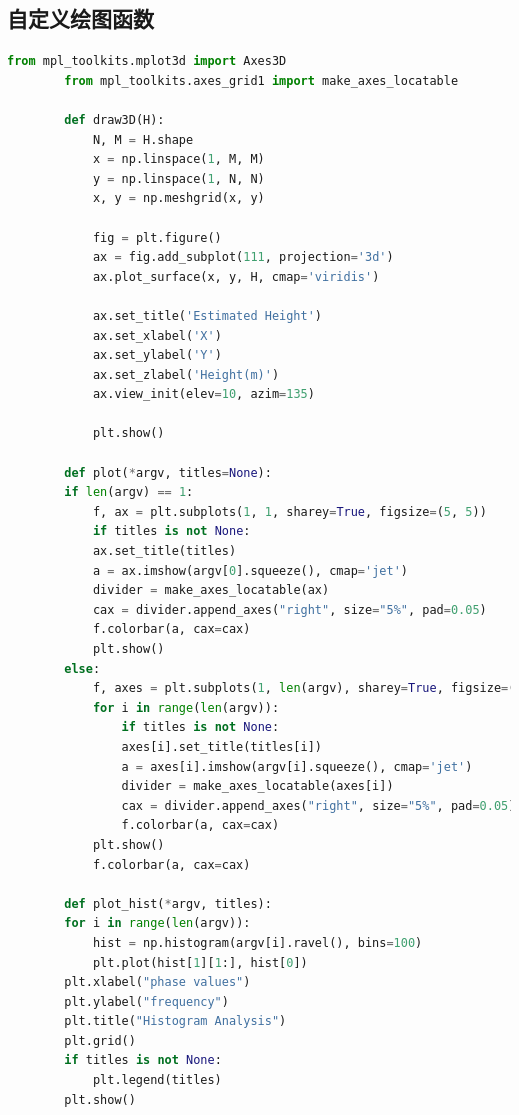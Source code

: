\documentclass[a4paper]{article}
\begin{document}
	\subsection{自定义绘图函数}
	\begin{lstlisting}[language=python,columns=fullflexible,frame=shadowbox]
		from mpl_toolkits.mplot3d import Axes3D
		from mpl_toolkits.axes_grid1 import make_axes_locatable

		def draw3D(H):
			N, M = H.shape
			x = np.linspace(1, M, M)
			y = np.linspace(1, N, N)
			x, y = np.meshgrid(x, y)

			fig = plt.figure()
			ax = fig.add_subplot(111, projection='3d')
			ax.plot_surface(x, y, H, cmap='viridis')

			ax.set_title('Estimated Height')
			ax.set_xlabel('X')
			ax.set_ylabel('Y')
			ax.set_zlabel('Height(m)')
			ax.view_init(elev=10, azim=135)

			plt.show()
			
		def plot(*argv, titles=None):
		if len(argv) == 1:
			f, ax = plt.subplots(1, 1, sharey=True, figsize=(5, 5))
			if titles is not None:
			ax.set_title(titles)
			a = ax.imshow(argv[0].squeeze(), cmap='jet')
			divider = make_axes_locatable(ax)
			cax = divider.append_axes("right", size="5%", pad=0.05)
			f.colorbar(a, cax=cax)
			plt.show()
		else:
			f, axes = plt.subplots(1, len(argv), sharey=True, figsize=(10, 10))
			for i in range(len(argv)):
				if titles is not None:
				axes[i].set_title(titles[i])
				a = axes[i].imshow(argv[i].squeeze(), cmap='jet')
				divider = make_axes_locatable(axes[i])
				cax = divider.append_axes("right", size="5%", pad=0.05)
				f.colorbar(a, cax=cax)
			plt.show()
			f.colorbar(a, cax=cax)

		def plot_hist(*argv, titles):
		for i in range(len(argv)):
			hist = np.histogram(argv[i].ravel(), bins=100)
			plt.plot(hist[1][1:], hist[0])
		plt.xlabel("phase values")
		plt.ylabel("frequency")
		plt.title("Histogram Analysis")
		plt.grid()
		if titles is not None:
			plt.legend(titles)
		plt.show()  
	\end{lstlisting}
\end{document}
